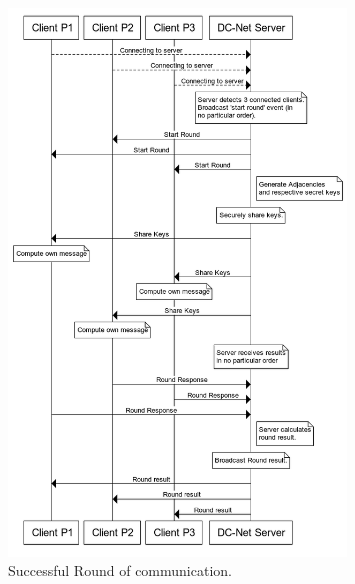 \begin{figure}[h!]
    \centering
    \includegraphics[width=0.8\textwidth]{Images/successfulRound.png}
    \caption{Successful Round of communication.}
    \label{fig:useCaseSuccessfulRound}
\end{figure}
